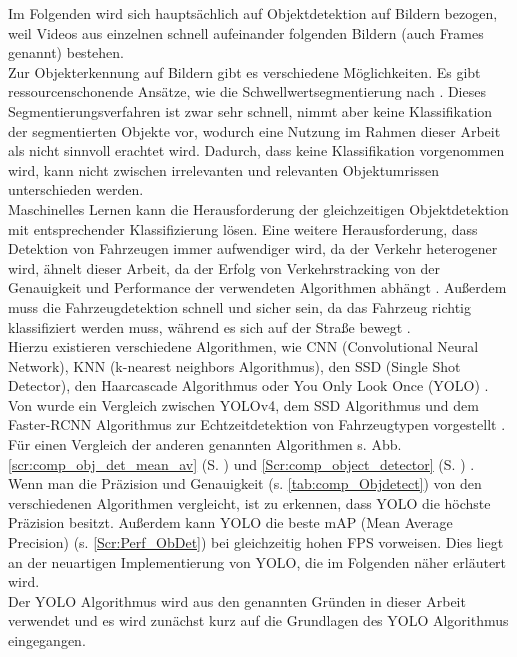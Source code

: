 {Im Folgenden wird sich hauptsächlich auf Objektdetektion auf Bildern bezogen, weil Videos aus einzelnen schnell aufeinander folgenden Bildern (auch Frames genannt) bestehen. \\
Zur Objekterkennung auf Bildern gibt es verschiedene Möglichkeiten. Es gibt ressourcenschonende Ansätze, wie die Schwellwertsegmentierung nach \citeauthor{Otsu1979} \cite{Otsu1979}. Dieses Segmentierungsverfahren ist zwar sehr schnell, nimmt aber keine Klassifikation der segmentierten Objekte vor, wodurch eine Nutzung im Rahmen dieser Arbeit als nicht sinnvoll erachtet wird. Dadurch, dass keine Klassifikation vorgenommen wird, kann nicht zwischen irrelevanten und relevanten Objektumrissen unterschieden werden. \\
Maschinelles Lernen kann die Herausforderung der gleichzeitigen Objektdetektion mit entsprechender Klassifizierung lösen. Eine weitere Herausforderung, dass Detektion von Fahrzeugen immer aufwendiger wird, da der Verkehr heterogener wird, ähnelt dieser Arbeit, da der Erfolg von Verkehrstracking von der Genauigkeit und Performance der verwendeten Algorithmen abhängt \citep{Pavani2022}. Außerdem muss die Fahrzeugdetektion schnell und sicher sein, da das Fahrzeug richtig klassifiziert werden muss, während es sich auf der Straße bewegt \citep{Kim2020_2}. \\
Hierzu existieren verschiedene Algorithmen, wie CNN (\glqq Convolutional Neural Network\grqq{}), KNN (\glqq k-nearest neighbors\grqq{} Algorithmus), den SSD (\glqq Single Shot Detector\grqq), den Haarcascade Algorithmus oder \glqq You Only Look Once\grqq{} (YOLO) \citep{Pavani2022, Kim2020_2}. \\
Von \citeauthor{Kim2020_2} \cite{Kim2020_2} wurde ein Vergleich zwischen YOLOv4, dem SSD Algorithmus und dem Faster-RCNN Algorithmus zur Echtzeitdetektion von Fahrzeugtypen vorgestellt \citep{Kim2020_2}. Für einen Vergleich der anderen genannten Algorithmen s. Abb. \ref{scr:comp_obj_det_mean_av} (S. \pageref{scr:comp_obj_det_mean_av}) und \ref{Scr:comp_object_detector} (S. \pageref{Scr:comp_object_detector}) \citep{Pavani2022}. \\
Wenn man die Präzision und Genauigkeit (s. \ref{tab:comp_Objdetect}) von den verschiedenen Algorithmen vergleicht, ist zu erkennen, dass YOLO die höchste Präzision besitzt. Außerdem kann YOLO die beste mAP (Mean Average Precision) (s. \ref{Scr:Perf_ObDet}) bei gleichzeitig hohen FPS vorweisen.  Dies liegt an der neuartigen Implementierung von YOLO, die im Folgenden näher erläutert wird. \\
Der YOLO Algorithmus wird aus den genannten Gründen in dieser Arbeit verwendet und es wird zunächst kurz auf die Grundlagen des YOLO Algorithmus eingegangen.

 }


